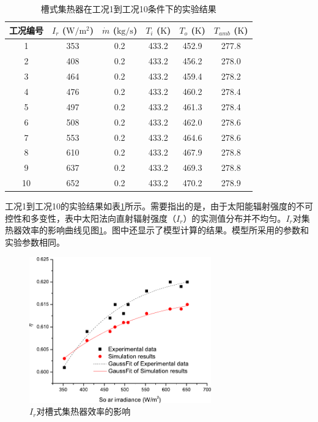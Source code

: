 \begin{table}[htbp]\footnotesize
\setlength{\abovecaptionskip}{-10pt}
	\caption{槽式集热器在工况1到工况10条件下的实验结果}
	\begin{center}
	\begin{tabular}{cccccc}
		\toprule
		工况编号	& $I_r$ ($\mathrm{W/m^2}$)	&	$\dot{m}$ ($\mathrm{kg/s}$)			&	$T_i$ ($\mathrm{K}$)	&	$T_o$ ($\mathrm{K}$)		&	$T_{amb}$ ($\mathrm{K}$)\\
		\midrule
		1	&	353	&	0.2	&	433.2	&	452.9	&	277.8\\
		2	&	408	&	0.2	&	433.2	&	456.2	&	278.0\\
		3	&	464	&	0.2	&	433.2	&	459.4	&	278.2\\
		4	&	476	&	0.2	&	433.2	&	460.2	&	278.4\\
		5	&	497	&	0.2	&	433.2	&	461.3	&	278.4\\
		6	&	508	&	0.2	&	433.2	&	462.0	&	278.6\\
		7	&	553	&	0.2	&	433.2	&	464.6	&	278.6\\
		8	&	610	&	0.2	&	433.2	&	467.9	&	278.8\\
		9	&	637	&	0.2	&	433.2	&	469.3	&	278.8\\
		10	&	652	&	0.2	&	433.2	&	470.2	&	278.9\\
		\bottomrule
	\end{tabular}
	\end{center}
	\label{tab:ResultOfTrough1}
\end{table}
工况1到工况10的实验结果如表\ref{tab:ResultOfTrough1}所示。需要指出的是，由于太阳能辐射强度的不可控性和多变性，表中太阳法向直射辐射强度（$I_r$）的实测值分布并不均匀。$I_r$对集热器效率的影响曲线见图\ref{fig:I_r-eta-trough}。图中还显示了模型计算的结果。模型所采用的参数和实验参数相同。
\begin{figure}[!ht]
\centering
\includegraphics[width=0.7\textwidth]{fig/I_r-eta-trough}
\caption{$I_r$对槽式集热器效率的影响}
\label{fig:I_r-eta-trough}
\end{figure}

